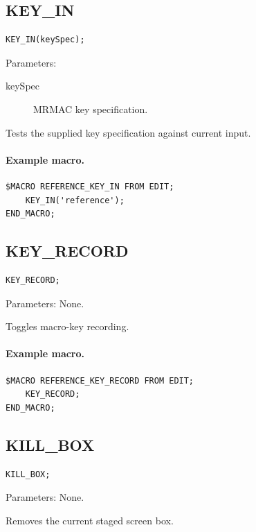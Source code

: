 \documentclass[a4paper,10pt,twoside,openany]{book}
\begin{document}
\label{prim:procedure-key-in}
\subsection*{KEY\_IN}
\begin{verbatim}
KEY_IN(keySpec);
\end{verbatim}
Parameters:
\begin{description}
\item[keySpec] MRMAC key specification.
\end{description}

Tests the supplied key specification against current input.

\paragraph{Example macro.}
\begin{verbatim}
$MACRO REFERENCE_KEY_IN FROM EDIT;
    KEY_IN('reference');
END_MACRO;
\end{verbatim}

\label{prim:procedure-key-record}
\subsection*{KEY\_RECORD}
\begin{verbatim}
KEY_RECORD;
\end{verbatim}
Parameters: None.

Toggles macro-key recording.

\paragraph{Example macro.}
\begin{verbatim}
$MACRO REFERENCE_KEY_RECORD FROM EDIT;
    KEY_RECORD;
END_MACRO;
\end{verbatim}

\label{prim:procedure-kill-box}
\subsection*{KILL\_BOX}
\begin{verbatim}
KILL_BOX;
\end{verbatim}
Parameters: None.

Removes the current staged screen box.
\end{document}
